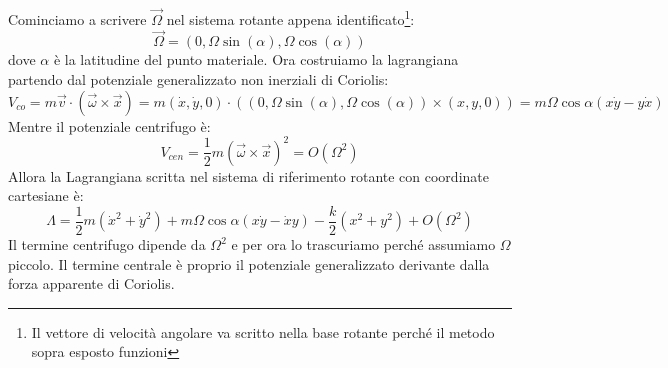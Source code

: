 \documentclass[a4paper,openany]{article}
\begin{document}
	Cominciamo a scrivere $\vec{\Omega}$ nel sistema rotante appena identificato\footnote{Il vettore di velocità angolare va scritto nella base rotante perché il metodo sopra esposto funzioni}:
	$$
	\vec{\Omega} = (0,\Omega \sin(\alpha), \Omega \cos(\alpha))
	$$
	dove $\alpha$ è la latitudine del punto materiale. Ora costruiamo la lagrangiana partendo dal potenziale generalizzato non inerziali di Coriolis:
	$$
	V_{co} = m\vec{v}\cdot(\vec{\omega}\times\vec{x}) = m(\dot{x},\dot{y},0) \cdot ((0,\Omega \sin(\alpha), \Omega \cos(\alpha))\times(x,y,0)) = m\Omega\cos\alpha(x\dot{y}-y\dot{x})
	$$
	Mentre il potenziale centrifugo è:
	$$
	V_{cen} = \dfrac{1}{2}m(\vec{\omega}\times\vec{x})^2 = O(\Omega^2)
	$$
	 Allora la Lagrangiana scritta nel sistema di riferimento rotante con coordinate cartesiane è:
	\begin{equation}
		\Lambda = \dfrac{1}{2}m(\dot{x}^{2}+\dot{y}^{2}) + m\Omega \cos\alpha (x\dot{y}-\dot{x}y) - \dfrac{k}{2}(x^2+y^2) + O(\Omega^2)
	\end{equation}
	Il termine centrifugo dipende da $\Omega^2$ e per ora lo trascuriamo perché assumiamo $\Omega$ piccolo. Il termine centrale è proprio il potenziale generalizzato derivante dalla forza apparente di Coriolis. 
	
\end{document}

